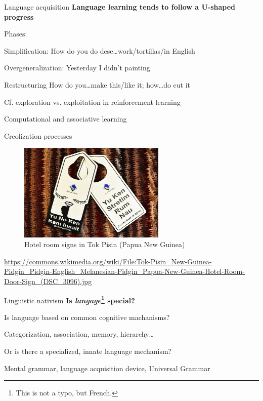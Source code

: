 \documentclass[aspectratio=169,cramped]{beamer}
\let\tempone\itemize
\let\temptwo\enditemize
\renewenvironment{itemize}{\tempone\addtolength{\itemsep}{-0\baselineskip}\addtolength{\parskip}{-0.2\baselineskip}}{\temptwo}
\newcommand{\ex}[1]{{\color{teal} #1}}
\begin{document}
\begin{frame}{Language acquisition}
	\textbf{Language learning tends to follow a U-shaped progress}
	\begin{itemize}
    \item Phases:
    \begin{itemize}
    \item Simplification: \ex{How do you do dese\ldots work/tortillas/in English}
    \item Overgeneralization: \ex{Yesterday I didn’t painting}
    \item Restructuring \ex{How do you\ldots make this/like it; how\ldots do cut it}
    \end{itemize}
  \item Cf. exploration vs. exploitation in reinforcement learning
  \item Computational and associative learning
  \end{itemize}
\end{frame}

\begin{frame}{Creolization processes}
  \vspace{-1cm}
  \begin{figure}
    \centering
    \includegraphics[width=7cm]{figures/hotel-sign.jpg}
    \caption{Hotel room signs in Tok Pisin (Papua New Guinea)}
  \end{figure}
  \vspace{-.1cm} \tiny \url{https://commons.wikimedia.org/wiki/File:Tok-Pisin_New-Guinea-Pidgin_Pidgin-English_Melanesian-Pidgin_Papua-New-Guinea-Hotel-Room-Door-Sign_(DSC_3096).jpg}
\end{frame}

\begin{frame}{Linguistic nativism}
	\textbf{Is \textit{langage}\footnote{This is not a typo, but French.} special?}
	\begin{itemize}
  \item Is language based on common cognitive machanisms?
    \begin{itemize}
    \item \ex{Categorization, association, memory, hierarchy\ldots}
    \end{itemize}
  \item Or is there a specialized, innate language mechanism?
    \begin{itemize}
    \item \ex{Mental grammar, language acquisition device, Universal Grammar}
    \end{itemize}
  \end{itemize}
\end{frame}
\end{document}
